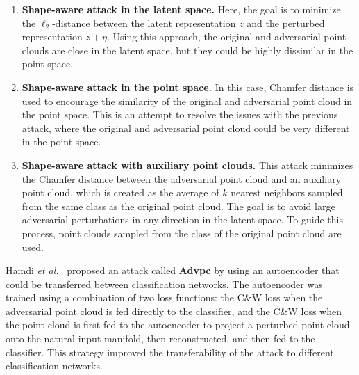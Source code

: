 \documentclass{ieeeaccess}
\def\etal{\textit{et al.}}
\begin{document}
\begin{enumerate}
\item \textbf{Shape-aware attack in the latent space.} Here, the goal is to minimize the $\ell_2$-distance between the latent representation $z$ and the perturbed representation $z+\eta$. Using this approach, the original and adversarial point clouds are close in the latent space, but they could be highly dissimilar in the point space. %

\item \textbf{Shape-aware attack in the point space.} In this case, Chamfer distance is used to encourage the similarity of the original and adversarial point cloud in the point space. This is an attempt %
to resolve the issues with the previous attack, where the original and adversarial point cloud could be very different in the point space. %

\item \textbf{Shape-aware attack with auxiliary point clouds.} This attack minimizes the Chamfer distance between the adversarial point cloud and an auxiliary point cloud, which is created as the average of $k$ nearest neighbors sampled from the same class as the original point cloud. The goal is to avoid large adversarial perturbations in any direction in the latent space. To guide %
this process, point clouds sampled from the class of the original point cloud are used.
\end{enumerate} 


\label{subsubsec:GAN}
Hamdi \etal~\cite{hamdi2020advpc} proposed an attack called \textbf{Advpc} by using an autoencoder that could be transferred between classification networks. The autoencoder was trained using a combination of two loss functions: the C\&W loss when the adversarial point cloud is fed directly to the classifier, and the C\&W loss when the point cloud is first fed to the autoencoder to project a perturbed point cloud onto the natural input manifold, then reconstructed, and then fed to the classifier. This strategy improved the transferability of the attack to different classification networks.
\end{document}
